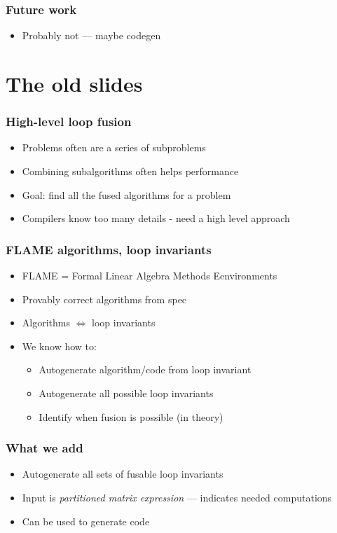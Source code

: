 \documentclass{beamer}
\begin{document}
\begin{frame}
  \frametitle{Future work}
  \begin{itemize}
  \item Probably not --- maybe codegen
  \end{itemize}
\end{frame}

\section*{The old slides}

\begin{frame}
  \frametitle{High-level loop fusion}
  \begin{itemize}
  \item Problems often are a series of subproblems
  \item Combining subalgorithms often helps performance
  \item Goal: find all the fused algorithms for a problem
  \item Compilers know too many details - need a high level approach
  \end{itemize}
\end{frame}

\begin{frame}
  \frametitle{FLAME algorithms, loop invariants}
  \begin{itemize}
  \item FLAME = Formal Linear Algebra Methods Eenvironments
  \item Provably correct algorithms from spec
  \item Algorithms $\Leftrightarrow$ loop invariants
  \item We know how to:
    \begin{itemize}
    \item Autogenerate algorithm/code from loop invariant
    \item Autogenerate all possible loop invariants
    \item Identify when fusion is possible (in theory)
    \end{itemize}
  \end{itemize}
\end{frame}

\begin{frame}
  \frametitle{What we add}
  \begin{itemize}
  \item Autogenerate all sets of fusable loop invariants
  \item Input is \emph{partitioned matrix expression} --- indicates needed computations
  \item Can be used to generate code
  \end{itemize}
\end{frame}
\end{document}
